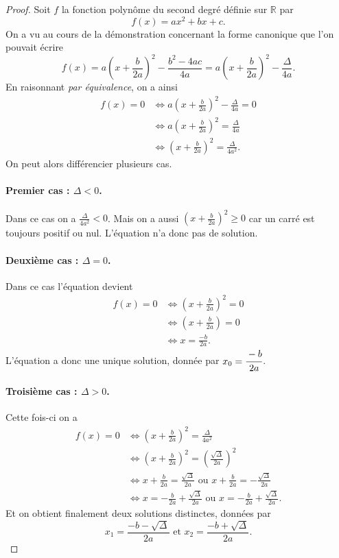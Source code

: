 \documentclass[11pt]{article}
\begin{document}
\begin{proof}
  Soit $f$ la fonction polynôme du second degré définie sur $\mathbb{R}$ par
  \[
    f(x) = ax^2+bx+c.
  \]
  On a vu au cours de la démonstration concernant la forme canonique que l'on
  pouvait écrire
  \[
    f(x) = a\left(x+\frac{b}{2a}\right)^2-\frac{b^2-4ac}{4a} =
    a\left(x+\frac{b}{2a}\right)^2-\frac{\Delta}{4a} .
  \]
  En raisonnant \emph{par équivalence}, on a ainsi
  \begin{align*}
    f(x) = 0 &\Longleftrightarrow a\left( x+\frac{b}{2a}
    \right)^2-\frac{\Delta}{4a}=0 \\
    &\Longleftrightarrow a\left( x+\frac{b}{2a}
    \right)^2=\frac{\Delta}{4a} \\
    &\Longleftrightarrow \left( x+\frac{b}{2a}
    \right)^2=\frac{\Delta}{4a^2}.
  \end{align*}
  On peut alors différencier plusieurs cas.
  \paragraph{Premier cas : $\Delta<0$.} Dans ce cas on a
  $\frac{\Delta}{4a^2}<0$. Mais on a aussi $\left( x+\frac{b}{2a} \right)^2\geq0$
  car un carré est toujours positif ou nul. L'équation n'a donc pas de solution.
  \paragraph{Deuxième cas : $\Delta=0$.} Dans ce cas l'équation devient
  \begin{align*}
    f(x) = 0 &\Longleftrightarrow \left( x+\frac{b}{2a} \right)^2 = 0 \\
    &\Longleftrightarrow \left( x+\frac{b}{2a} \right) = 0 \\
    &\Longleftrightarrow x = \frac{-b}{2a}.
  \end{align*}
  L'équation a donc une unique solution, donnée par $x_0=\cfrac{-b}{2a}$.
  \paragraph{Troisième cas : $\Delta>0$.} Cette fois-ci on a
  \begin{align*}
    f(x) = 0 &\Longleftrightarrow \left( x+\frac{b}{2a} \right)^2 =
    \frac{\Delta}{4a^2} \\
    &\Longleftrightarrow \left( x+\frac{b}{2a} \right)^2 =
    \left( \frac{\sqrt\Delta}{2a} \right)^2 \\
    &\Longleftrightarrow x+\frac{b}{2a}=\frac{\sqrt\Delta}{2a}\text{ ou
    }x+\frac{b}{2a}=-\frac{\sqrt\Delta}{2a}\\
    &\Longleftrightarrow x=-\frac{b}{2a}+\frac{\sqrt\Delta}{2a}\text{ ou
    }x=-\frac{b}{2a}+\frac{\sqrt\Delta}{2a}.
  \end{align*}
  Et on obtient finalement deux solutions distinctes, données par
  \[
    x_1 = \frac{-b-\sqrt\Delta}{2a}\text{ et }x_2 =
    \frac{-b+\sqrt\Delta}{2a}.
  \]
\end{proof}
\end{document}
